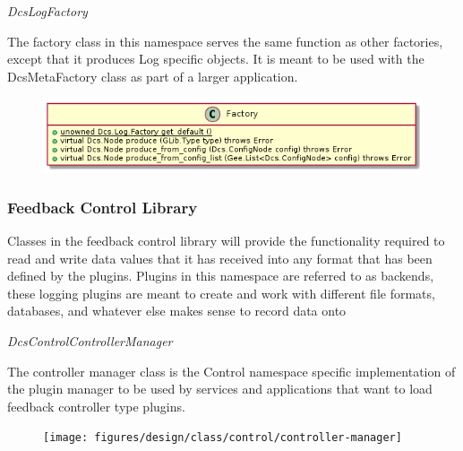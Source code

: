       \emph{DcsLogFactory}

      \vspace*{-0.75cm}
      \begin{minipage}[t]{0.5\textwidth}
      	\vspace*{0.5cm}
        The factory class in this namespace serves the same function as other
        factories, except that it produces Log specific objects. It is meant to
        be used with the DcsMetaFactory class as part of a larger application.
      \end{minipage} \hfill
      \begin{minipage}[t]{0.45\textwidth}
        \begin{figure}[H]
          \includegraphics[width=\textwidth]{figures/design/class/log/factory}
          \label{fig:dsg-classes-log-factory}
        \end{figure}
      \end{minipage}

    \subsubsection{Feedback Control Library}\label{sec:dsg-classes-ctl}

      Classes in the feedback control library will provide the functionality
      required to
      read and write data values that it has received into any
      format that has been defined by the plugins. Plugins in this namespace are
      referred to as backends, these logging plugins are meant to create and
      work with different file formats, databases, and whatever else makes sense
      to record data onto

      \emph{DcsControlControllerManager}

      \vspace*{-0.75cm}
      \begin{minipage}[t]{0.5\textwidth}
      	\vspace*{0.5cm}
        The controller manager class is the Control namespace specific
        implementation of the plugin manager to be used by services and
        applications that want to load feedback controller type plugins.
      \end{minipage} \hfill
      \begin{minipage}[t]{0.45\textwidth}
        \begin{figure}[H]
          \texttt{[image: figures/design/class/control/controller-manager]}
          \label{fig:dsg-classes-control-controller-manager}
        \end{figure}
      \end{minipage}

